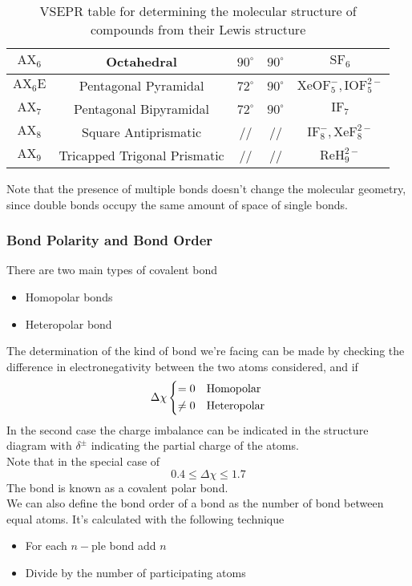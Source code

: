 \documentclass[../qm.tex]{subfiles}
\begin{document}
\begin{table}[H]
\begin{tabular}{|c|c|c|c|c|}
		$\mathrm{AX_6}$&Octahedral&$90^\circ$&$90^\circ$&$\mathrm{SF_6}$\\\hline
		$\mathrm{AX_6E}$&Pentagonal Pyramidal&$72^\circ$&$90^\circ$&$\mathrm{XeOF_5^-}, \mathrm{IOF_5^{2-}}$\\\hline
		$\mathrm{AX_7}$&Pentagonal Bipyramidal&$72^\circ$&$90^\circ$&$\mathrm{IF_7}$\\\hline
		$\mathrm{AX_8}$&Square Antiprismatic&//&//&$\mathrm{IF_8^-}, \mathrm{XeF_8^{2-}}$\\\hline
		$\mathrm{AX_9}$&Tricapped Trigonal Prismatic&//&//&$\mathrm{ReH_9^{2-}}$\\\hline
	\end{tabular}
	\caption{VSEPR table for determining the molecular structure of compounds from their Lewis structure}
	\label{tab:vsepr.chem}
\end{table}
Note that the presence of multiple bonds doesn't change the molecular geometry, since double bonds occupy the same amount of space of single bonds.
\subsubsection{Bond Polarity and Bond Order}
There are two main types of covalent bond
\begin{itemize}
\item Homopolar bonds
\item Heteropolar bond
\end{itemize}
The determination of the kind of bond we're facing can be made by checking the difference in electronegativity between the two atoms considered, and if
\begin{equation*}
	\Delta\chi\begin{dcases}
		=0&\text{Homopolar}\\
		\ne0&\text{Heteropolar}
	\end{dcases}
\end{equation*}
In the second case the charge imbalance can be indicated in the structure diagram with $\delta^{\pm}$ indicating the partial charge of the atoms.\\
Note that in the special case of
\begin{equation*}
	0.4\le\Delta\chi\le1.7
\end{equation*}
The bond is known as a covalent polar bond.\\
We can also define the bond order of a bond as the number of bond between equal atoms. It's calculated with the following technique
\begin{itemize}
\item For each $n-$ple bond add $n$
\item Divide by the number of participating atoms
\end{itemize}
\end{document}
